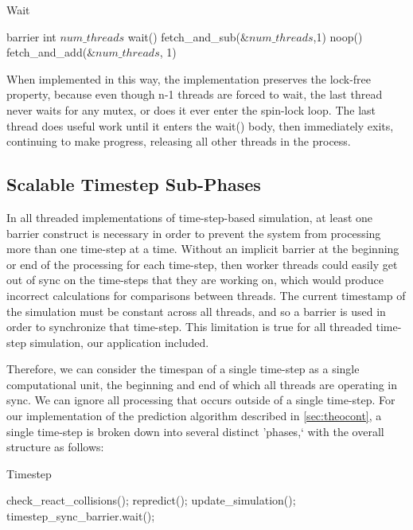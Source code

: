 \documentclass[CEJCS,PDF]{cej} %
\begin{document}
\begin{algorithm}
\label{barrier}
\caption{Wait}
\begin{algorithmic}
\STATE barrier
	\STATE int $num\_threads$ 
	\STATE wait()
	\STATE {}
	\STATE fetch\_and\_sub($\&num\_threads$,1)
	\STATE {}
		\STATE noop()
	\ENDWHILE
	\STATE {}
	\STATE fetch\_and\_add($\&num\_threads$, 1)
\end{algorithmic}
\end{algorithm}

When implemented in this way, the implementation preserves the lock-free property, because even though n-1 threads are forced to wait, the last thread never waits for any 
mutex, or does it ever enter the spin-lock loop.  The last thread does useful work until it enters the wait() body, then immediately exits, continuing to make progress, releasing all
other threads in the process.

\subsection{Scalable Timestep Sub-Phases}
\label{sec:stsp}
In all threaded implementations of time-step-based simulation, at least one barrier construct
is necessary in order to prevent the system from processing more than one time-step at a time.  Without an implicit barrier at the beginning or end of the 
processing for each time-step, then worker threads could easily get out of sync on the time-steps that they are working on, which would produce incorrect calculations
for comparisons between threads.  The current timestamp of the simulation must be constant across all threads, and so a barrier is used in order to synchronize that time-step.  This
limitation is true for all threaded time-step simulation, our application included.

Therefore, we can consider the timespan of a single time-step as a single computational unit, the beginning and end of which all threads are operating in sync.  We can ignore
all processing that occurs outside of a single time-step.  For our implementation of the prediction algorithm described in \ref{sec:theocont}, a single time-step is broken down
into several distinct 'phases,` with the overall structure as follows:

\begin{algorithm}
\caption{Timestep}
\begin{algorithmic}
\STATE check\_react\_collisions();
\STATE repredict();
\STATE update\_simulation();
\STATE timestep\_sync\_barrier.wait();
\end{algorithmic}
\end{algorithm}
\end{document}

